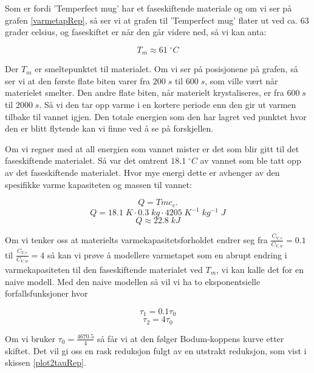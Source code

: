 \documentclass[ reprint, amsmath,amssymb, aps]{revtex4-2}
\begin{document}
Som er fordi 'Temperfect mug' har et faseskiftende materiale og om vi ser på grafen \ref{varmetapRep}, så ser vi at grafen til 'Temperfect mug' flater ut ved ca. 63 grader celsius, og faseskiftet er når den går videre ned, så vi kan anta:

$$T_m \approx 61 \; ^{\circ}C$$

Der $T_m$ er smeltepunktet til materialet. Om vi ser på posisjonene på grafen, så ser vi at den første flate biten varer fra $200 \; s$ til $600 \;s$, som ville vært når materielet smelter. Den andre flate biten, når materielt krystaliseres, er fra $600 \; s$ til $2000 \; s$. Så vi den tar opp varme i en kortere periode enn den gir ut varmen tilbake til vannet igjen. Den totale energien som den har lagret ved punktet hvor den er blitt flytende kan vi finne ved å se på forskjellen. 

Om vi regner med at all energien som vannet mister er det som blir gitt til det faseskiftende materialet. Så var det omtrent $18.1 \; ^{\circ}C$ av vannet som ble tatt opp av det faseskiftende materialet. Hvor mye energi dette er avhenger av den spesifikke varme kapasiteten og massen til vannet:

$$Q = T m c_v.$$
$$Q = 18.1 \; K \cdot 0.3 \; kg \cdot 4205 \; K^{-1}\; kg^{-1} \; J $$
$$Q \approx 22.8 \; kJ$$

Om vi tenker oss at materielts varmekapasitetsforholdet endrer seg fra $\frac{C_{V, c}}{C_{V, w}} = 0.1$ til $\frac{C_{V, c}}{C_{V, w}} = 4$ så kan vi prøve å modellere varmetapet som en abrupt endring i varmekapasiteten til den faseskiftende materialet ved $T_m$, vi kan kalle det for en naive modell. Med den naive modellen så vil vi ha to eksponentsielle forfallsfunksjoner hvor

$$\tau_1 = 0.1 \tau_0$$
$$\tau_2 = 4 \tau_0$$

Om vi bruker $ \tau_0 = \frac{4670.5}{4}$ så får vi at den følger Bodum-koppens kurve etter skiftet. Det vil gi oss en rask reduksjon fulgt av en utstrakt reduksjon, som vist i skissen \ref{plot2tauRep}.
\end{document}
